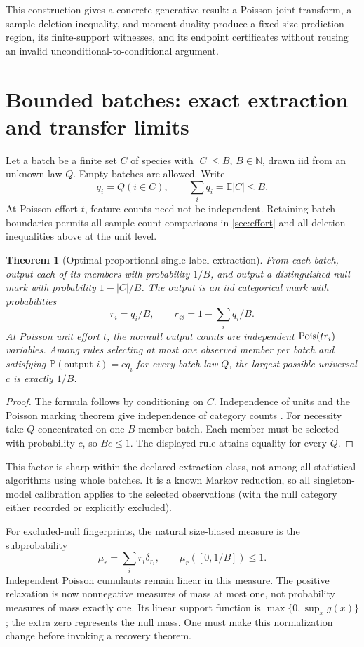 \documentclass[11pt]{article}
\numberwithin{equation}{section}
\newtheorem{theorem}{Theorem}[section]
\theoremstyle{definition}
\theoremstyle{remark}
\newcommand{\E}{\mathbb E}\newcommand{\Pp}{\mathbb P}\newcommand{\R}{\mathbb R}\newcommand{\N}{\mathbb N}
\begin{document}
This construction gives a concrete generative result: a Poisson joint transform, a sample-deletion inequality, and moment duality produce a fixed-size prediction region, its finite-support witnesses, and its endpoint certificates without reusing an invalid unconditional-to-conditional argument.

\section{Bounded batches: exact extraction and transfer limits}\label{sec:batch}
Let a batch be a finite set $C$ of species with $|C|\le B$, $B\in\N$, drawn iid from an unknown law $Q$. Empty batches are allowed. Write
\[
 q_i=Q(i\in C),\qquad \sum_iq_i=\E|C|\le B.
\]
At Poisson effort $t$, feature counts need not be independent. Retaining batch boundaries permits all sample-count comparisons in \cref{sec:effort} and all deletion inequalities above at the unit level.

\begin{theorem}[Optimal proportional single-label extraction]\label{thm:batchmark}
From each batch, output each of its members with probability $1/B$, and output a distinguished null mark with probability $1-|C|/B$. The output is an iid categorical mark with probabilities
\[
 r_i=q_i/B,\qquad r_\varnothing=1-\sum_iq_i/B.
\]
At Poisson unit effort $t$, the nonnull output counts are independent $\operatorname{Pois}(tr_i)$ variables. Among rules selecting at most one observed member per batch and satisfying $\Pp(\text{output }i)=c q_i$ for every batch law $Q$, the largest possible universal $c$ is exactly $1/B$.
\end{theorem}
\begin{proof}
The formula follows by conditioning on $C$. Independence of units and the Poisson marking theorem give independence of category counts \cite[Theorems 5.6 and 5.8]{LastPenrose2017}. For necessity take $Q$ concentrated on one $B$-member batch. Each member must be selected with probability $c$, so $Bc\le1$. The displayed rule attains equality for every $Q$.
\end{proof}
This factor is sharp within the declared extraction class, not among all statistical algorithms using whole batches. It is a known Markov reduction, so all singleton-model calibration applies to the selected observations (with the null category either recorded or explicitly excluded).

For excluded-null fingerprints, the natural size-biased measure is the subprobability
\[
 \mu_r=\sum_i r_i\delta_{r_i},\qquad \mu_r([0,1/B])\le1.
\]
Independent Poisson cumulants remain linear in this measure. The positive relaxation is now nonnegative measures of mass at most one, not probability measures of mass exactly one. Its linear support function is $\max\{0,\sup_xg(x)\}$; the extra zero represents the null mass. One must make this normalization change before invoking a recovery theorem.
\end{document}
